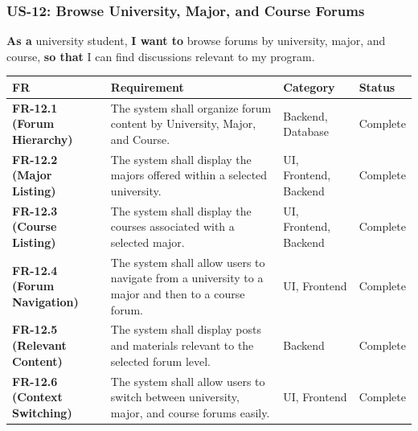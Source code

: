 \documentclass[12pt]{article}
\renewcommand{\baselinestretch}{1.5}
\begin{document}
\hypertarget{sec:us-12-browse-university-major-and-course-forums}{}
\subsubsection*{US-12: Browse University, Major, and Course Forums}
\par\medskip

\textbf{As a} university student, \textbf{I want to} browse forums by university, major, and course, \textbf{so that} I can find discussions relevant to my program.
\par\medskip

\begingroup
\small
\renewcommand{\baselinestretch}{1.0}\selectfont
\renewcommand{\arraystretch}{1.15}
\setlength{\tabcolsep}{6pt}
\begin{longtable}{|>{\raggedright\arraybackslash}p{}|>{\raggedright\arraybackslash}p{}|>{\raggedright\arraybackslash}p{}|>{\raggedright\arraybackslash}p{}|}
\hline
\textbf{FR} & \textbf{Requirement} & \textbf{Category} & \textbf{Status} \\ \hline
\endhead
\textbf{FR-12.1 (Forum Hierarchy)} & The system shall organize forum content by University, Major, and Course. & Backend, Database & Complete \\ \hline
\textbf{FR-12.2 (Major Listing)} & The system shall display the majors offered within a selected university. & UI, Frontend, Backend & Complete \\ \hline
\textbf{FR-12.3 (Course Listing)} & The system shall display the courses associated with a selected major. & UI, Frontend, Backend & Complete \\ \hline
\textbf{FR-12.4 (Forum Navigation)} & The system shall allow users to navigate from a university to a major and then to a course forum. & UI, Frontend & Complete \\ \hline
\textbf{FR-12.5 (Relevant Content)} & The system shall display posts and materials relevant to the selected forum level. & Backend & Complete \\ \hline
\textbf{FR-12.6 (Context Switching)} & The system shall allow users to switch between university, major, and course forums easily. & UI, Frontend & Complete \\ \hline
\end{longtable}
\endgroup
\par\medskip
\end{document}
